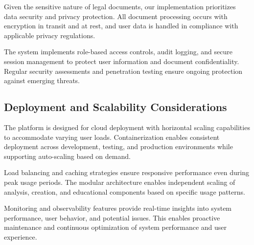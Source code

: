 Given the sensitive nature of legal documents, our implementation prioritizes data security and privacy protection. All document processing occurs with encryption in transit and at rest, and user data is handled in compliance with applicable privacy regulations.

The system implements role-based access controls, audit logging, and secure session management to protect user information and document confidentiality. Regular security assessments and penetration testing ensure ongoing protection against emerging threats.

\subsection{Deployment and Scalability Considerations}

The platform is designed for cloud deployment with horizontal scaling capabilities to accommodate varying user loads. Containerization enables consistent deployment across development, testing, and production environments while supporting auto-scaling based on demand.

Load balancing and caching strategies ensure responsive performance even during peak usage periods. The modular architecture enables independent scaling of analysis, creation, and educational components based on specific usage patterns.

Monitoring and observability features provide real-time insights into system performance, user behavior, and potential issues. This enables proactive maintenance and continuous optimization of system performance and user experience.
